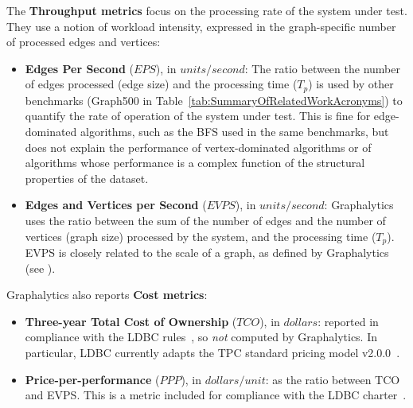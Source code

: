 The {\bf Throughput metrics} focus on the processing rate of the system under test. They use a notion of workload intensity, expressed in the graph-specific number of processed edges and vertices:
\begin{itemize}
	\item {\bf Edges Per Second} ($\textit{EPS}$), in $\textit{units} / \textit{second}$: The ratio between the number of edges processed (edge size) and the processing time ($T_p$) is used by other benchmarks (Graph500 in Table~\ref{tab:SummaryOfRelatedWorkAcronyms}) to quantify the rate of operation of the system under test. This is fine for edge-dominated algorithms, such as the BFS used in the same benchmarks, but does not explain the performance of vertex-dominated algorithms or of algorithms whose performance is a complex function of the structural properties of the dataset.
	
	\item {\bf Edges and Vertices per Second} ($\textit{EVPS}$), in $\textit{units} / \textit{second}$: Graphalytics uses the ratio between the sum of the number of edges and the number of vertices (graph size) processed by the system, and the processing time ($T_p$). EVPS is closely related to the scale of a graph, as defined by Graphalytics (see ).
\end{itemize}

Graphalytics also reports {\bf Cost metrics}:

\begin{itemize}
	\item {\bf Three-year Total Cost of Ownership} ($\textit{TCO}$), in $\textit{dollars}$: reported in compliance with the LDBC rules~\cite{ldbc_byelaws}, so {\it not} computed by Graphalytics. In particular, LDBC currently adapts the TPC standard pricing model v2.0.0~\cite{tpc_pricing}.
	
	\item {\bf Price-per-performance} ($\textit{PPP}$), in $\textit{dollars} / \textit{unit}$: as the ratio between TCO and EVPS. This is a metric included for compliance with the LDBC charter~\cite{ldbc_byelaws}.

	

\end{itemize}




